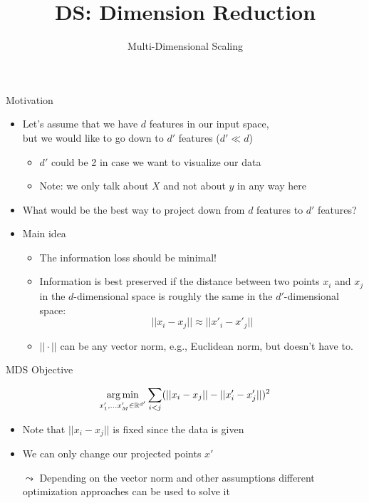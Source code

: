 \documentclass[aspectratio=169]{../latex_main/tntbeamer}  %
\title[MDS]{DS: Dimension Reduction}
\subtitle{Multi-Dimensional Scaling}
\begin{document}
	
	\maketitle
	
    \begin{frame}[c]{Motivation}
        
        \begin{itemize}
            \item Let's assume that we have $d$ features in our input space,\\ but we would like to go down to $d'$ features ($d' \ll d$)
            \begin{itemize}
                \item $d'$ could be 2 in case we want to visualize our data
                \item Note: we only talk about $X$ and not about $y$ in any way here
            \end{itemize}
            \medskip
            \item What would be the best way to project down from $d$ features to $d'$ features?
            \item Main idea
            \begin{itemize}
                \item The information loss should be minimal!
                \item Information is best preserved if the distance between two points $x_i$ and $x_j$ in the $d$-dimensional space is roughly the same in the $d'$-dimensional space:
                $$ ||x_i - x_j || \approx || x'_i - x'_j || $$
                \item $||\cdot||$ can be any vector norm, e.g., Euclidean norm, but doesn't have to.
            \end{itemize}
        \end{itemize}

	\end{frame}
	
	\begin{frame}[c]{MDS Objective}
        
         $$\operatorname*{arg\,min}_{x'_1, \ldots x'_M \in \mathbb{R}^{d'}} \sum_{i< j}  (||x_i - x_j || - || x'_i - x'_j ||)^2$$
        
        \begin{itemize}
            
            \item Note that $||x_i - x_j ||$ is fixed since the data is given
            \item We can only change our projected points $x'$
            \item[$\leadsto$] Depending on the vector norm and other assumptions different optimization approaches can be used to solve it
        \end{itemize}
        
	\end{frame}
	
\end{document}
